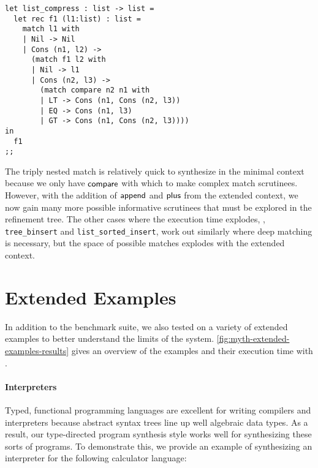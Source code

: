 \begin{center}
  \begin{minipage}{0.5\textwidth}
    \begin{lstlisting}
let list_compress : list -> list =
  let rec f1 (l1:list) : list =
    match l1 with
    | Nil -> Nil
    | Cons (n1, l2) ->
      (match f1 l2 with
      | Nil -> l1
      | Cons (n2, l3) ->
        (match compare n2 n1 with
        | LT -> Cons (n1, Cons (n2, l3))
        | EQ -> Cons (n1, l3)
        | GT -> Cons (n1, Cons (n2, l3))))
in
  f1
;;
    \end{lstlisting}
  \end{minipage}
\end{center}

The triply nested match is relatively quick to synthesize in the minimal context because we only have $\mathsf{compare}$ with which to make complex match scrutinees.
However, with the addition of $\mathsf{append}$ and $\mathsf{plus}$ from the extended context, we now gain many more possible informative scrutinees that must be explored in the refinement tree.
The other cases where the execution time explodes, \eg, \texttt{tree\_binsert} and \texttt{list\_sorted\_insert}, work out similarly where deep matching is necessary, but the space of possible matches explodes with the extended context.

\section{Extended Examples}
\label{sec:extended-examples}



In addition to the benchmark suite, we also tested \myth{} on a variety of extended examples to better understand the limits of the system.
\autoref{fig:myth-extended-examples-results} gives an overview of the examples and their execution time with \myth{}.

\paragraph{Interpreters}

Typed, functional programming languages are excellent for writing compilers and interpreters because abstract syntax trees line up well algebraic data types.
As a result, our type-directed program synthesis style works well for synthesizing these sorts of programs.
To demonstrate this, we provide an example of synthesizing an interpreter for the following calculator language:

